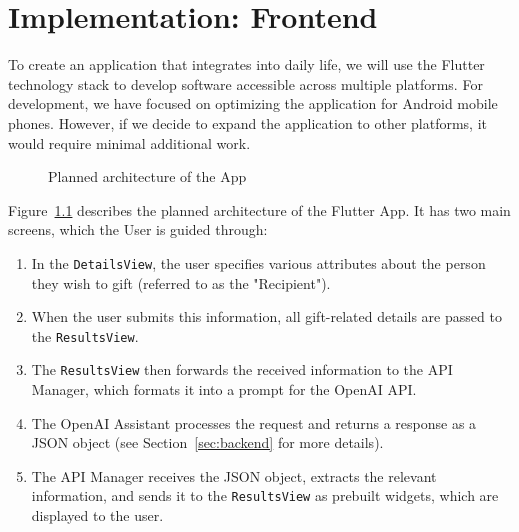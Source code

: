 \chapter{Implementation: Frontend}
\label{chapter:implementation-frontend}

To create an application that integrates into daily life, we will use the Flutter technology stack to develop software accessible across multiple platforms. For development, we have focused on optimizing the application for Android mobile phones. However, if we decide to expand the application to other platforms, it would require minimal additional work.

\begin{figure}[!ht]
	\centering

	\caption{Planned architecture of the App}
	\label{fig:architecture}
\end{figure}

Figure~\ref{fig:architecture} describes the planned architecture of the Flutter App. It has two main screens, which the User is guided through:
\begin{enumerate}
	\item In the \texttt{DetailsView}, the user specifies various attributes about the person they wish to gift (referred to as the "Recipient").
	\item When the user submits this information, all gift-related details are passed to the \texttt{ResultsView}.
	\item The \texttt{ResultsView} then forwards the received information to the API Manager, which formats it into a prompt for the OpenAI API.
	\item The OpenAI Assistant processes the request and returns a response as a JSON object (see Section~\ref{sec:backend} for more details).
	\item The API Manager receives the JSON object, extracts the relevant information, and sends it to the \texttt{ResultsView} as prebuilt widgets, which are displayed to the user.
\end{enumerate}

